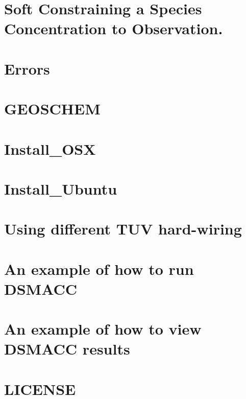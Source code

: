 \documentclass[twoside]{book}
\newcommand{\+}{\discretionary{\mbox{\scriptsize$\hookleftarrow$}}{}{}}
\begin{document}
\chapter{Soft Constraining a Species Concentration to Observation.}
\label{md_src_docs_constrain_obs}

\chapter{Errors}
\label{md_src_docs_errors}

\chapter{G\+E\+O\+S\+C\+H\+EM}
\label{md_src_docs_geoschem}

\chapter{Install\+\_\+\+O\+SX}
\label{md_src_docs_Install_OSX}

\chapter{Install\+\_\+\+Ubuntu}
\label{md_src_docs_Install_Ubuntu}

\chapter{Using different T\+UV hard-\/wiring}
\label{md_src_docs_newtuv}

\chapter{An example of how to run D\+S\+M\+A\+CC}
\label{md_src_docs_run}

\chapter{An example of how to view D\+S\+M\+A\+CC results}
\label{md_src_docs_view_results}

\chapter{L\+I\+C\+E\+N\+SE}
\label{md_TUV_5_82_81_LICENSE}

\end{document}
